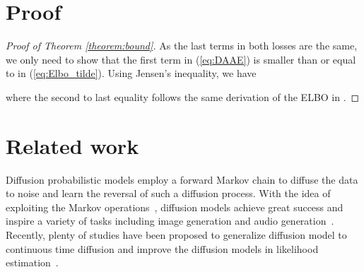 \documentclass{article} \usepackage{iclr2023_conference,times}
\newcommand{\ba}[1]{}
\newcommand{\given}{\,|\,}
\def\Eqref#1{(\ref{#1})}
\def\rvx{{\mathbf{x}}}
\def\gL{{\mathcal{L}}}
\newcommand{\E}{\mathbb{E}}
\theoremstyle{plain}
\theoremstyle{definition}
\theoremstyle{remark}
\begin{document}
{\section{Proof}
\begin{proof}[Proof of Theorem \ref{theorem:bound}]
As the last terms in both losses are the same, we only need to show that the first term in \Eqref{eq:DAAE} is smaller than or equal to  in \Eqref{eq:Elbo_tilde}.
    Using Jensen's inequality, we have
\ba{
&-\E_{q(\rvx_{0})}\E_{q(\rvx_{T_\text{trunc}}\given \rvx_0)}\log p_{\theta}(\rvx_0\given \rvx_{T_\text{trunc}})\notag\\
&=  -\E_{q(\rvx_{0})}\E_{q(\rvx_{T_\text{trunc}}\given \rvx_0)} \log\E_{q(\rvx_{1: {T_\text{trunc}}-1}\given  \rvx_0,\rvx_{T_\text{trunc}})}\left[\frac{ p(\rvx_{0: {T_\text{trunc}}-1}\given \rvx_{T_\text{trunc}})}{q(\rvx_{1: {T_\text{trunc}}-1}\given \rvx_0,\rvx_{T_\text{trunc}})} \right]\notag\\
&\le -\E_{q(\rvx_{0})}\E_{q(\rvx_{T_\text{trunc}}\given \rvx_0)} \E_{q(\rvx_{1: {T_\text{trunc}}-1}\given \rvx_0,\rvx_{T_\text{trunc}})} \log\frac{ p(\rvx_{0: {T_\text{trunc}}-1}\given \rvx_{T_\text{trunc}})}{q(\rvx_{1: {T_\text{trunc}}-1}\given \rvx_0,\rvx_{T_\text{trunc}})} \notag\\
&=- \E_{q(\rvx_{0})}\E_{q(\rvx_{1: {T_\text{trunc}}}\given \rvx_0)} \log\left[\frac{ p(\rvx_{0: {T_\text{trunc}}-1})}{q(\rvx_{1: {T_\text{trunc}}}\given \rvx_0)} 
\frac{q(\rvx_{{T_\text{trunc}}}\given \rvx_0)}{ p(\rvx_{T_\text{trunc}})}\right]
\notag\\
&=\left(- \E_{q(\rvx_{0})}\E_{q(\rvx_{1: {T_\text{trunc}}}\given \rvx_0)} \log\frac{ p(\rvx_{0: {T_\text{trunc}}-1})}{q(\rvx_{1: {T_\text{trunc}}}\given \rvx_0)}\right)
-
\E_{q(\rvx_{0})}\E_{q(\rvx_{{T_\text{trunc}}}\given \rvx_0)}\log
\frac{q(\rvx_{{T_\text{trunc}}}\given \rvx_0)}{ p(\rvx_{T_\text{trunc}})}\notag\\
&=(  \textstyle \sum_{t=1}^{T_\text{trunc}}\gL_{t-1}+ \gL_{T_\text{trunc}} 
) - \gL_{T_\text{trunc}} \notag\\
&=\sum_{t=1}^{T_\text{trunc}}\gL_{t-1},
}
where the second to last equality follows the same derivation of the ELBO in \citet{ddpm}.
\end{proof}

\section{Related work}\label{sec:relatedwork} Diffusion probabilistic models \citep{diffusion, ddpm} employ a forward Markov chain to diffuse the data to noise  and learn the reversal of such a diffusion process. With the idea of exploiting the Markov operations~\citep{goyal2017variational, alain2016gsns, bordes2017learning}, diffusion models achieve great success and inspire a variety of tasks including image generation and audio generation~\citep{diffwave,wavegrad,adversarialdiff,vahdat2021score}. Recently, plenty of studies have been proposed to generalize diffusion model to continuous time diffusion and improve the diffusion models in likelihood estimation~\citep{vincent2011connection, improvedscore,scorematching,nichol2021improved,song2021scorebased,song2021maximum,kingma2021variational}.  

}
\end{document}
